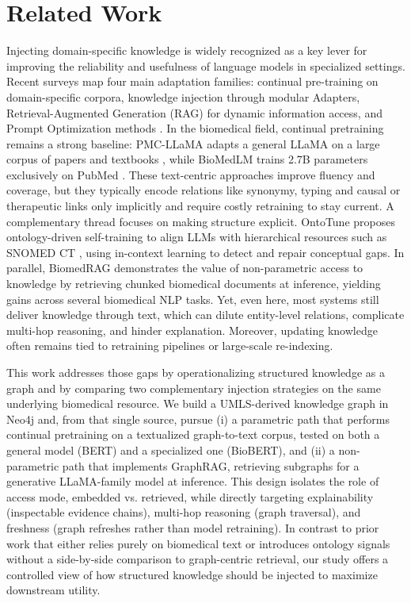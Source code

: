 \documentclass[10pt, a4paper]{article}
\begin{document}
\section{Related Work}
Injecting domain-specific knowledge is widely recognized as a key lever for improving the reliability and usefulness of language models in specialized settings. Recent surveys map four main adaptation families: continual pre-training on domain-specific corpora, knowledge injection through modular Adapters, Retrieval-Augmented Generation (RAG) for dynamic information access, and Prompt Optimization methods \cite{song2025injecting}.
In the biomedical field, continual pretraining remains a strong baseline: PMC-LLaMA adapts a general LLaMA on a large corpus of papers and textbooks \cite{wu2024pmc}, while BioMedLM trains 2.7B parameters exclusively on PubMed \cite{bolton2024biomedlm}. These text-centric approaches improve fluency and coverage, but they typically encode relations like synonymy, typing and causal or therapeutic links only implicitly and require costly retraining to stay current.
A complementary thread focuses on making structure explicit. OntoTune \cite{liu2025ontotune} proposes ontology-driven self-training to align LLMs with hierarchical resources such as SNOMED CT \cite{schulz2008snomed}, using in-context learning to detect and repair conceptual gaps.
In parallel, BiomedRAG \cite{li2025biomedrag} demonstrates the value of non-parametric access to knowledge by retrieving chunked biomedical documents at inference, yielding gains across several biomedical NLP tasks. Yet, even here, most systems still deliver knowledge through text, which can dilute entity-level relations, complicate multi-hop reasoning, and hinder explanation. Moreover, updating knowledge often remains tied to retraining pipelines or large-scale re-indexing.

This work addresses those gaps by operationalizing structured knowledge as a graph and by comparing two complementary injection strategies on the same underlying biomedical resource. We build a UMLS-derived knowledge graph in Neo4j and, from that single source, pursue (i) a parametric path that performs continual pretraining on a textualized graph-to-text corpus, tested on both a general model (BERT) and a specialized one (BioBERT), and (ii) a non-parametric path that implements GraphRAG, retrieving subgraphs for a generative LLaMA-family model at inference. This design isolates the role of access mode, embedded vs. retrieved, while directly targeting explainability (inspectable evidence chains), multi-hop reasoning (graph traversal), and freshness (graph refreshes rather than model retraining). In contrast to prior work that either relies purely on biomedical text or introduces ontology signals without a side-by-side comparison to graph-centric retrieval, our study offers a controlled view of how structured knowledge should be injected to maximize downstream utility.
\end{document}
